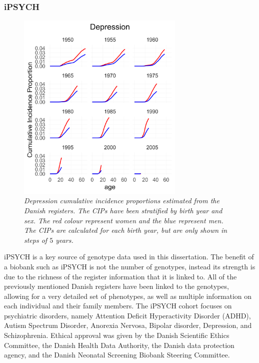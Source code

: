 \subsubsection{iPSYCH}
\begin{figure}
	\includegraphics[width=8cm]{methods/prevalencePlot_DEP.png}
	\caption[Cumulative incidence proportions from the Danish 
	Registers]{
		\sl Depression cumulative incidence proportions estimated from the 
		Danish registers. The CIPs have been stratified by birth year and sex. The 
		red colour represent women and the blue represent men. The CIPs are 
		calculated for each birth year, but are only shown in steps of $ 
		5 $ years.}
	\label{fig:CIP_DEP}
\end{figure}
iPSYCH is a key source of genotype data used in this dissertation. The benefit of a biobank such as iPSYCH is not the number of genotypes, instead its strength is due to the richness of the register information that it is linked to. All of the previously mentioned Danish registers have been linked to the genotypes, allowing for a very detailed set of phenotypes, as well as multiple information on each individual and their family members. The iPSYCH cohort focuses on psychiatric disorders, namely Attention Deficit Hyperactivity Disorder (ADHD), Autism Spectrum Disorder, Anorexia Nervosa, Bipolar disorder, Depression, and Schizophrenia\cite{pedersen2018ipsych2012}. Ethical approval was given by the Danish Scientific Ethics Committee, the Danish Health Data Authority, the Danish data protection agency, and the Danish Neonatal Screening Biobank Steering Committee.

